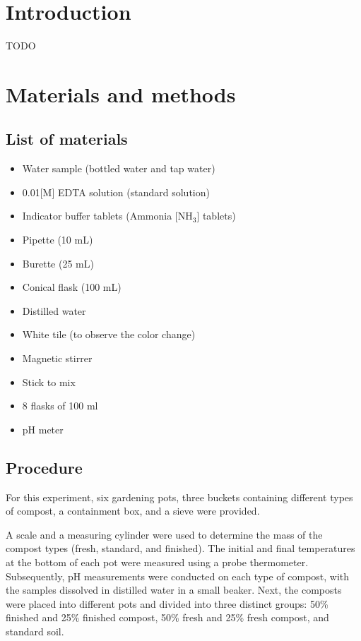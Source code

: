 \documentclass{article}
\begin{document}
\tableofcontents
\pagebreak

\section{Introduction}
TODO

\section{Materials and methods}
\subsection{List of materials}
\begin{itemize}
    \item Water sample (bottled water and tap water)
    \item 0.01[M] EDTA solution (standard solution)
    \item Indicator buffer tablets (Ammonia [NH$_3$] tablets)
    \item Pipette (10 mL)
    \item Burette (25 mL)
    \item Conical flask (100 mL)
    \item Distilled water
    \item White tile (to observe the color change)
    \item Magnetic stirrer
    \item Stick to mix
    \item 8 flasks of 100 ml
    \item pH meter
\end{itemize}

\subsection{Procedure}
For this experiment, six gardening pots, three buckets containing different types of 
compost, a containment box, and a sieve were provided.

A scale and a measuring cylinder were used to determine the mass of the compost types
(fresh, standard, and finished). The initial and final temperatures at the bottom of each
pot were measured using a probe thermometer. Subsequently, pH measurements were conducted on each type of compost, with the samples
dissolved in distilled water in a small beaker. Next, the composts were placed into different pots and divided into three distinct
groups: 50\% finished and 25\% finished compost, 50\% fresh and 25\% fresh compost, and
standard soil.
\end{document}
